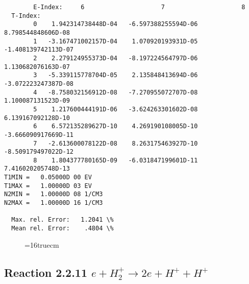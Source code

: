 \documentclass[12pt,dvipdfmx]{article}
\begin{document}
\begin{small}
\begin{verbatim}
        E-Index:     6                     7                     8
  T-Index:
        0    1.942314738448D-04   -6.597388255594D-06    8.798544848606D-08
        1   -3.167471002157D-04    1.070920193931D-05   -1.408139742113D-07
        2    2.279124955373D-04   -8.197224564797D-06    1.130682076163D-07
        3   -5.339115778704D-05    2.135848413694D-06   -3.072223247387D-08
        4   -8.758032156912D-08   -7.270955072707D-08    1.100087131523D-09
        5    1.217600444191D-06   -3.624263301602D-08    6.139167092128D-10
        6    6.572135289627D-10    4.269190108005D-10   -3.666090917669D-11
        7   -2.613600078122D-08    8.263175463927D-10   -8.509179497022D-12
        8    1.804377780165D-09   -6.031847199601D-11    7.416020205748D-13
T1MIN =   0.05000D 00 EV
T1MAX =   1.00000D 03 EV
N2MIN =   1.00000D 08 1/CM3
N2MAX =   1.00000D 16 1/CM3

  Max. rel. Error:   1.2041 \%
  Mean rel. Error:    .4804 \%
\end{verbatim}\end{small}
\begin{figure} \label{2.2.10}
\epsfxsize=16truecm
\end{figure}
\newpage



\subsection{
Reaction 2.2.11   $e + H_2^+      \rightarrow 2e + H^+ + H^+ $
}
\end{document}
